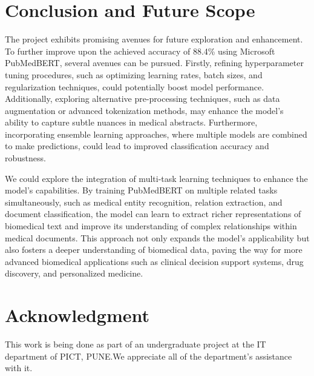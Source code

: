\documentclass[conference]{IEEEtran}
\begin{document}
\section{Conclusion and Future Scope}
The project exhibits promising avenues for future exploration and enhancement. To further improve upon the achieved accuracy of 88.4\% using Microsoft PubMedBERT, several avenues can be pursued. Firstly, refining hyperparameter tuning procedures, such as optimizing learning rates, batch sizes, and regularization techniques, could potentially boost model performance. Additionally, exploring alternative pre-processing techniques, such as data augmentation or advanced tokenization methods, may enhance the model's ability to capture subtle nuances in medical abstracts. Furthermore, incorporating ensemble learning approaches, where multiple models are combined to make predictions, could lead to improved classification accuracy and robustness. 
\par
We could explore the integration of multi-task learning techniques to enhance the model's capabilities.
By training PubMedBERT on multiple related tasks simultaneously, such as medical entity recognition, relation extraction, and document classification, the model can learn to extract richer representations of biomedical text and improve its understanding of complex relationships within medical documents. This approach not only expands the model's applicability but also fosters a deeper understanding of biomedical data, paving the way for more advanced biomedical applications such as clinical decision support systems, drug discovery, and personalized medicine.
\section*{Acknowledgment}

This work is being done as part of an undergraduate project at the IT department of PICT, PUNE.We appreciate all of the department's assistance with it.
\end{document}
